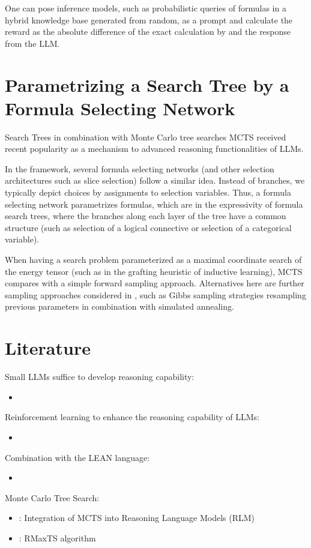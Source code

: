 \documentclass[aps,onecolumn,nofootinbib,pra]{article}
\begin{document}
One can pose \tnreason inference models, such as probabilistic queries of formulas in a hybrid knowledge base generated from random, as a prompt and calculate the reward as the absolute difference of the exact calculation by \tnreason and the response from the LLM.



\section{Parametrizing a Search Tree by a Formula Selecting Network}

Search Trees in combination with Monte Carlo tree searches MCTS received recent popularity as a mechanism to advanced reasoning functionalities of LLMs.

In the \tnreason framework, several formula selecting networks (and other selection architectures such as slice selection) follow a similar idea.
Instead of branches, we typically depict choices by assignments to selection variables.
Thus, a formula selecting network parametrizes formulas, which are in the expressivity of formula search trees, where the branches along each layer of the tree have a common structure (such as selection of a logical connective or selection of a categorical variable).

When having a  search problem parameterized as a maximal coordinate search of the energy tensor (such as in the grafting heuristic of inductive learning), MCTS compares with a simple forward sampling approach.
Alternatives here are further sampling approaches considered in \tnreason, such as Gibbs sampling strategies resampling previous parameters in combination with simulated annealing.


\section{Literature}

Small LLMs suffice to develop reasoning capability:
\begin{itemize}
	\item \cite{guan_rstar-math_2025}
\end{itemize}

Reinforcement learning to enhance the reasoning capability of LLMs:
\begin{itemize}
	\item \cite{deepseek-ai_deepseek-r1_2025}
\end{itemize}

Combination with the LEAN language:
\begin{itemize}
	\item \cite{xin_deepseek-prover-v15_2024}
\end{itemize}

Monte Carlo Tree Search:
\begin{itemize}
	\item \cite{besta_reasoning_2025}: Integration of MCTS into Reasoning Language Models (RLM)
	\item \cite{xin_deepseek-prover-v15_2024}: RMaxTS algorithm
\end{itemize}




\end{document}
